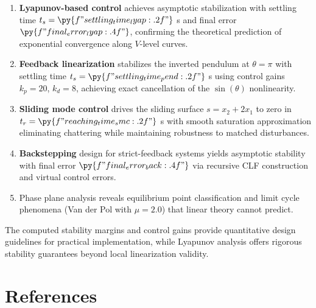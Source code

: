 \documentclass[a4paper, 11pt]{article}
\begin{document}
\begin{enumerate}
\item \textbf{Lyapunov-based control} achieves asymptotic stabilization with settling time
$t_s = \py{f"{settling_time_lyap:.2f}"}$ s and final error $\py{f"{final_error_lyap:.4f}"}$,
confirming the theoretical prediction of exponential convergence along $V$-level curves.

\item \textbf{Feedback linearization} stabilizes the inverted pendulum at $\theta = \pi$ with
settling time $t_s = \py{f"{settling_time_pend:.2f}"}$ s using control gains $k_p = 20$, $k_d = 8$,
achieving exact cancellation of the $\sin(\theta)$ nonlinearity.

\item \textbf{Sliding mode control} drives the sliding surface $s = x_2 + 2x_1$ to zero in
$t_r = \py{f"{reaching_time_smc:.2f}"}$ s with smooth saturation approximation eliminating
chattering while maintaining robustness to matched disturbances.

\item \textbf{Backstepping} design for strict-feedback systems yields asymptotic stability with
final error $\py{f"{final_error_back:.4f}"}$ via recursive CLF construction and virtual control errors.

\item Phase plane analysis reveals equilibrium point classification and limit cycle phenomena
(Van der Pol with $\mu = 2.0$) that linear theory cannot predict.
\end{enumerate}

The computed stability margins and control gains provide quantitative design guidelines for
practical implementation, while Lyapunov analysis offers rigorous stability guarantees beyond
local linearization validity.

\section*{References}
\end{document}
